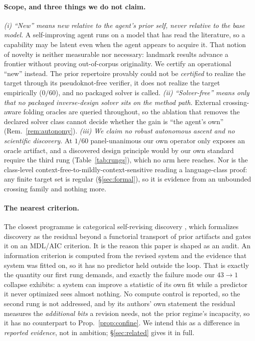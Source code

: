\documentclass[11pt]{article}
\begin{document}
\paragraph{Scope, and three things we do not claim.} \emph{(i) ``New'' means new relative to the agent's prior
self, never relative to the base model.} A self-improving agent runs on a model that has read the literature, so a capability may be latent even when the
agent appears to acquire it. That notion of novelty is neither measurable nor necessary: landmark results
advance a frontier without proving out-of-corpus originality. We certify an operational ``new'' instead. The
prior repertoire provably could not be \emph{certified} to realize the target through its pseudoknot-free
verifier, it does not realize the target empirically ($0/60$), and no packaged solver is called. \emph{(ii) ``Solver-free'' means only that no packaged inverse-design solver sits on
the method path.} External crossing-aware folding oracles are queried throughout, so the ablation that removes
the declared solver class cannot decide whether the gain is ``the agent's own'' (Rem.~\ref{rem:autonomy}).
\emph{(iii) We claim no robust autonomous ascent and no scientific discovery.} At $1/60$ panel-unanimous our
own operator only exposes an oracle artifact, and a discovered design principle would by our own standard
require the third rung (Table~\ref{tab:rungs}), which no arm here reaches. Nor is the class-level
context-free-to-mildly-context-sensitive reading a language-class proof: any finite target set is regular
(\S\ref{sec:formal}), so it is evidence from an unbounded crossing family and nothing more.

\paragraph{The nearest criterion.} The closest programme is categorical self-revising discovery
\citep{selfrevising}, which formalizes discovery as the residual beyond a functorial transport of prior
artifacts and gates it on an MDL/AIC criterion. It is the reason this paper is shaped as an audit. An information criterion is computed from the revised system and the evidence that system was fitted on, so it
has no predictor held outside the loop. That is exactly the quantity our first rung demands, and exactly the
failure mode our $43\!\to\!1$ collapse exhibits: a system can improve a statistic of its own fit while a
predictor it never optimized sees almost nothing. No compute control is reported, so the second rung is not
addressed, and by its authors' own statement the residual measures the \emph{additional bits} a revision
needs, not the prior regime's incapacity, so it has no counterpart to Prop.~\ref{prop:confine}. We intend this
as a difference in \emph{reported evidence}, not in ambition; \S\ref{sec:related} gives it in full.
\end{document}
